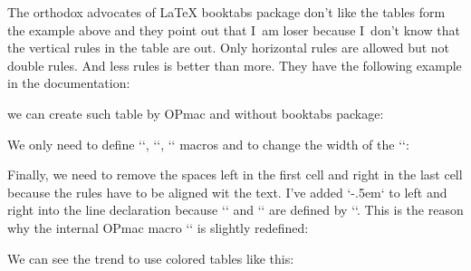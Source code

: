  


The orthodox advocates of LaTeX booktabs package don't like the tables form the example above and they point out that I~am loser because I~don't know that the vertical rules in the table are out. Only horizontal rules are allowed but not double rules. And less rules is better than more. They have the following example in the documentation: 






we can create such table by OPmac and without booktabs package: 

\begtt
{} 
\endtt


We only need to define `\crtop`, `\crmid`, `\crbot` macros and to change the width of the `\tablinefil`: 

\begtt
\def\crtop{\crcr \noalign{\hrule height.6pt \kern2.5pt}} 
\def\crbot{\crcr \noalign{\kern2.5pt\hrule height.6pt}} 
\def\crmid{\crcr \noalign{\kern1pt\hrule\kern1pt}} 
\def\tablinefil{\leaders\hrule height.2pt\hfil\vrule height1.7pt depth1.5pt width0pt } 
\endtt


Finally, we need to remove the spaces left in the first cell and right in the last cell because the rules have to be aligned wit the text. I've added `\kern-.5em` to left and right into the line declaration because `\tabiteml` and `\tabitemr` are defined by `\enspace`. This is the reason why the internal OPmac macro `\tableA` is slightly redefined: 

\begtt
\def\tableA#1#2{\offinterlineskip \def\tmpa{}\tabdata={\kern-.5em}\scantabdata#1\relax 
   \halign\expandafter{\the\tabdata\kern-.5em\tabstrutA\cr#2\crcr}\egroup} 
\endtt

 


We can see the trend to use colored tables like this: 






